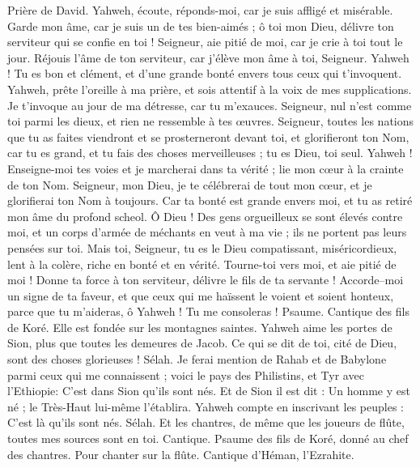 \begin{multicols}{2}
\VerseOne{}Prière de David. Yahweh, écoute, réponds-moi, car je suis affligé et misérable.
Garde mon âme, car je suis un de tes bien-aimés ; ô toi mon Dieu, délivre ton serviteur qui se confie en toi !
Seigneur, aie pitié de moi, car je crie à toi tout le jour.
Réjouis l'âme de ton serviteur, car j'élève mon âme à toi, Seigneur.
Yahweh ! Tu es bon et clément, et d'une grande bonté envers tous ceux qui t'invoquent.
Yahweh, prête l'oreille à ma prière, et sois attentif à la voix de mes supplications.
Je t'invoque au jour de ma détresse, car tu m'exauces.
Seigneur, nul n'est comme toi parmi les dieux, et rien ne ressemble à tes œuvres.
Seigneur, toutes les nations que tu as faites viendront et se prosterneront devant toi, et glorifieront ton Nom,
car tu es grand, et tu fais des choses merveilleuses ; tu es Dieu, toi seul.
Yahweh ! Enseigne-moi tes voies et je marcherai dans ta vérité ; lie mon cœur à la crainte de ton Nom.
Seigneur, mon Dieu, je te célébrerai de tout mon cœur, et je glorifierai ton Nom à toujours.
Car ta bonté est grande envers moi, et tu as retiré mon âme du profond scheol.
Ô Dieu ! Des gens orgueilleux se sont élevés contre moi, et un corps d'armée de méchants en veut à ma vie ; ils ne portent pas leurs pensées sur toi.
Mais toi, Seigneur, tu es le Dieu compatissant, miséricordieux, lent à la colère, riche en bonté et en vérité.
Tourne-toi vers moi, et aie pitié de moi ! Donne ta force à ton serviteur, délivre le fils de ta servante !
Accorde–moi un signe de ta faveur, et que ceux qui me haïssent le voient et soient honteux, parce que tu m'aideras, ô Yahweh ! Tu me consoleras !
\VerseOne{}Psaume. Cantique des fils de Koré. Elle est fondée sur les montagnes saintes.
Yahweh aime les portes de Sion, plus que toutes les demeures de Jacob.
Ce qui se dit de toi, cité de Dieu, sont des choses glorieuses ! Sélah.
Je ferai mention de Rahab et de Babylone parmi ceux qui me connaissent ; voici le pays des Philistins, et Tyr avec l'Ethiopie: C'est dans Sion qu'ils sont nés.
Et de Sion il est dit : Un homme y est né ; le Très-Haut lui-même l'établira.
Yahweh compte en inscrivant les peuples : C'est là qu'ils sont nés. Sélah.
Et les chantres, de même que les joueurs de flûte, toutes mes sources sont en toi.
\VerseOne{}Cantique. Psaume des fils de Koré, donné au chef des chantres. Pour chanter sur la flûte. Cantique d'Héman, l'Ezrahite.

\end{multicols}

